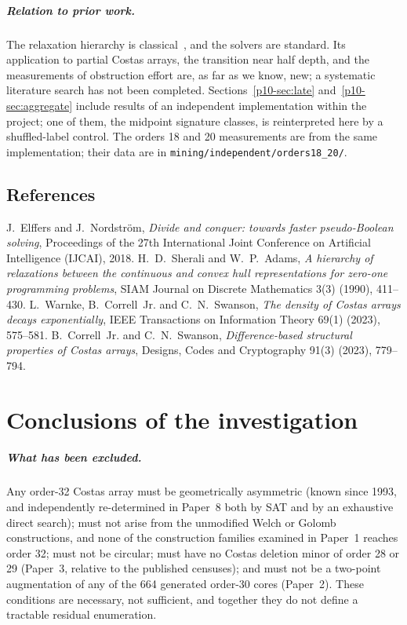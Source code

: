 \documentclass[11pt,a4paper,oneside]{report}
\makeatletter
\theoremstyle{definition}
\newenvironment{paperrefs}{\section*{References}\list{\@biblabel{\@arabic\c@enumiv}}{\settowidth\labelwidth{\@biblabel{99}}\leftmargin\labelwidth\advance\leftmargin\labelsep\usecounter{enumiv}\let\p@enumiv\@empty\renewcommand\theenumiv{\@arabic\c@enumiv}}\sloppy\small}{\endlist}
\makeatother
\begin{document}
\paragraph{Relation to prior work.} The relaxation hierarchy is classical~\cite{p10-sherali1990}, and the solvers
are standard. Its application to partial Costas arrays, the transition near half depth, and the
measurements of obstruction effort are, as far as we know, new; a systematic literature search has not been
completed. Sections~\ref{p10-sec:late} and~\ref{p10-sec:aggregate} include results of an independent implementation within the project; one of them, the midpoint signature classes, is reinterpreted here by a shuffled-label control. The orders 18 and 20 measurements are from the same implementation; their data are in \texttt{mining/independent/orders18\_20/}.
\begin{paperrefs}
 J.~Elffers and J.~Nordstr\"om, \emph{Divide and conquer: towards faster pseudo-Boolean solving}, Proceedings of the 27th International Joint Conference on Artificial Intelligence (IJCAI), 2018.
 H.~D.~Sherali and W.~P.~Adams, \emph{A hierarchy of relaxations between the continuous and convex hull representations for zero-one programming problems}, SIAM Journal on Discrete Mathematics 3(3) (1990), 411--430.
 L.~Warnke, B.~Correll~Jr. and C.~N.~Swanson, \emph{The density of Costas arrays decays exponentially}, IEEE Transactions on Information Theory 69(1) (2023), 575--581.
 B.~Correll~Jr. and C.~N.~Swanson, \emph{Difference-based structural properties of Costas arrays}, Designs, Codes and Cryptography 91(3) (2023), 779--794.
\end{paperrefs}


\chapter*{Conclusions of the investigation}

\paragraph{What has been excluded.} Any order-32 Costas array must be geometrically asymmetric
(known since 1993, and independently re-determined in Paper~8 both by SAT and by an exhaustive direct
search); must not arise from the unmodified Welch
or Golomb constructions, and none of the construction families examined in Paper~1 reaches order
32; must not be circular; must have no Costas deletion minor of order 28 or 29 (Paper~3, relative to
the published censuses); and must not be a two-point augmentation of any of the 664 generated
order-30 cores (Paper~2). These conditions are necessary, not sufficient, and together they do not
define a tractable residual enumeration.
\end{document}
